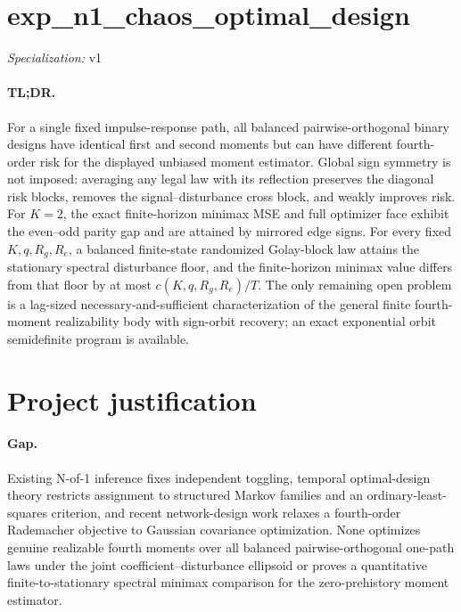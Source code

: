\documentclass{article}
\begin{document}
\sloppy

\section*{exp\_\allowbreak{}n1\_\allowbreak{}chaos\_\allowbreak{}optimal\_\allowbreak{}design}

\noindent\textit{Specialization:} v1\par

\paragraph{TL;DR.} For a single fixed impulse-response path, all balanced pairwise-orthogonal binary designs have identical first and second moments but can have different fourth-order risk for the displayed unbiased moment estimator. Global sign symmetry is not imposed: averaging any legal law with its reflection preserves the diagonal risk blocks, removes the signal--disturbance cross block, and weakly improves risk. For \(K=2\), the exact finite-horizon minimax MSE and full optimizer face exhibit the even--odd parity gap and are attained by mirrored edge signs. For every fixed \(K,q,R_g,R_e\), a balanced finite-state randomized Golay-block law attains the stationary spectral disturbance floor, and the finite-horizon minimax value differs from that floor by at most \(c(K,q,R_g,R_e)/T\). The only remaining open problem is a lag-sized necessary-and-sufficient characterization of the general finite fourth-moment realizability body with sign-orbit recovery; an exact exponential orbit semidefinite program is available.

\section{Project justification}

\paragraph{Gap.} Existing N-of-1 inference fixes independent toggling, temporal optimal-design theory restricts assignment to structured Markov families and an ordinary-least-squares criterion, and recent network-design work relaxes a fourth-order Rademacher objective to Gaussian covariance optimization. None optimizes genuine realizable fourth moments over all balanced pairwise-orthogonal one-path laws under the joint coefficient--disturbance ellipsoid or proves a quantitative finite-to-stationary spectral minimax comparison for the zero-prehistory moment estimator.
\end{document}
